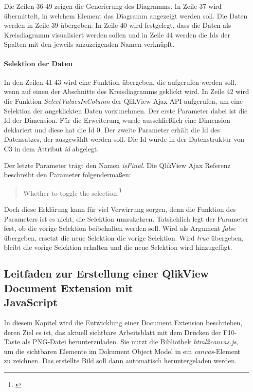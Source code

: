Die Zeilen 36-49 zeigen die Generierung des Diagramms. In Zeile 37 wird übermittelt, in welchem Element das Diagramm angezeigt werden soll. Die Daten werden in Zeile 39 übergeben. In Zeile 40 wird festgelegt, dass die Daten als Kreisdiagramm visualisiert werden sollen und in Zeile 44 werden die Ids der Spalten mit den jeweils anzuzeigenden Namen verknüpft.

\paragraph{Selektion der Daten}

In den Zeilen 41-43 wird eine Funktion übergeben, die aufgerufen werden soll, wenn auf einen der Abschnitte des Kreis\-diagramms geklickt wird. In Zeile 42 wird die Funktion \textit{SelectValuesInColumn} der QlikView Ajax API aufgerufen, um eine Selektion der angeklickten Daten vorzunehmen. Der erste Parameter dabei ist die Id der Dimension. Für die Erweiterung wurde ausschließlich eine Dimension deklariert und diese hat die Id 0. Der zweite Parameter erhält die Id des Daten\-satzes, der ausgewählt werden soll. Die Id wurde in der Daten\-struktur von C3 in dem Attribut \textit{id} abgelegt.

Der letzte Parameter trägt den Namen \textit{isFinal}. Die QlikView Ajax Referenz beschreibt den Parameter folgendermaßen:
\begin{quote}
Whether to toggle the selection.\footnote{\cite{JsDocReferenceQvDocumentObjectDataSelectValuesInColumn}}
\end{quote}
Doch diese Erklärung kann für viel Verwirrung sorgen, denn die Funktion des Parameters ist es nicht, die Selektion umzukehren. Tatsächlich legt der Parameter fest, ob die vorige Selektion beibehalten werden soll. Wird als Argument \textit{false} übergeben, ersetzt die neue Selektion die vorige Selektion. Wird \textit{true} übergeben, bleibt die vorige Selektion erhalten und die neue Selektion wird hinzugefügt.

\subsection{Leitfaden zur Erstellung einer QlikView Document Extension mit \\JavaScript}
\label{lab:LeitfadenZurErstellungEinerQlikViewDocumentExtensionMitJavaScript} 

In diesem Kapitel wird die Entwicklung einer Document Extension beschrieben, deren Ziel es ist, das aktuell sichtbare Arbeitsblatt mit dem Drücken der F10-Taste als PNG-Datei herunterzuladen. Sie nutzt die Bibliothek \textit{html2canvas.js}, um die sichtbaren Elemente im Dokument Object Model in ein \textit{canvas}-Element zu zeichnen. Das erstellte Bild soll dann automatisch heruntergeladen werden.

